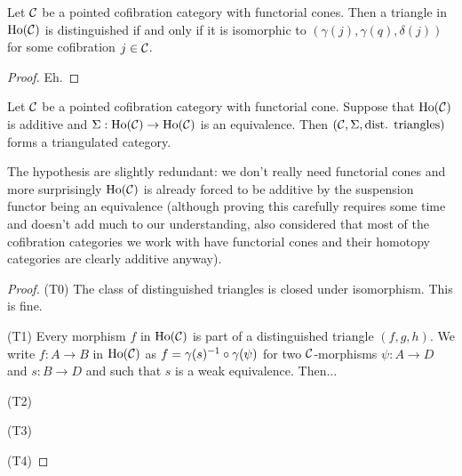 \begin{proposition}
Let $\mathcal{C}$ be a pointed cofibration category with functorial cones. Then a triangle in $\operatorname{Ho}(\mathcal{C})$ is distinguished if and only if it is isomorphic to $(\gamma(j),\gamma(q),\delta(j))$ for some cofibration $j\in\mathcal{C}$.
\end{proposition}

\begin{proof}
Eh.

\medskip
{}
\smallskip
\end{proof}

\begin{theorem}
Let $\mathcal{C}$ be a pointed cofibration category with functorial cone. Suppose that $\operatorname{Ho}(\mathcal{C})$ is additive and $\Sigma:\operatorname{Ho}(\mathcal{C})\to\operatorname{Ho}(\mathcal{C})$ is an equivalence. Then $(\mathcal{C},\Sigma,\text{dist. triangles})$ forms a triangulated category.
\end{theorem}

\begin{remark}
The hypothesis are slightly redundant: we don't really need functorial cones and more surprisingly $\operatorname{Ho}(\mathcal{C})$ is already forced to be additive by the suspension functor being an equivalence (although proving this carefully requires some time and doesn't add much to our understanding, also considered that most of the cofibration categories we work with have functorial cones and their homotopy categories are clearly additive anyway).
\end{remark}

\begin{proof}
(T0) The class of distinguished triangles is closed under isomorphism. This is fine.

(T1) Every morphism $f$ in $\operatorname{Ho}(\mathcal{C})$ is part of a distinguished triangle $(f,g,h)$. We write $f:A\to B$ in $\operatorname{Ho}(\mathcal{C})$ as $f=\gamma(s)^{-1}\circ\gamma(\psi)$ for two $\mathcal{C}$-morphisms $\psi:A\to D$ and $s:B\to D$ and such that $s$ is a weak equivalence. Then...

\medskip
{}
\smallskip

(T2)

\medskip
{}
\smallskip

(T3)

\medskip
{}
\medskip

(T4)

\medskip
{}
\medskip

\renewcommand{\qed}{\hfill\tit{To be continued...}}
\end{proof}
